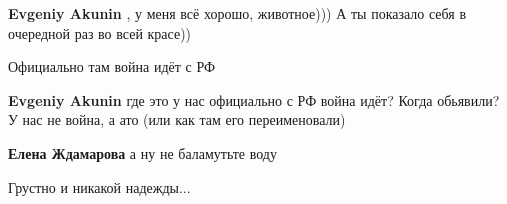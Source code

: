 \begin{itemize}
\begin{itemize}
 
\textbf{Evgeniy Akunin} , у меня всё хорошо, животное))) А ты показало себя в очередной раз во всей красе))

\end{itemize}

 
Официально там война идёт с РФ \Laughey[1.0][white]

\begin{itemize}
 
\textbf{Evgeniy Akunin} где это у нас официально с РФ война идёт? Когда
обьявили? У нас не война, а ато (или как там его переименовали)

 
\textbf{Елена Ждамарова} а ну не баламутьте воду
\end{itemize}

 
Грустно и никакой надежды...

 

\end{itemize}
